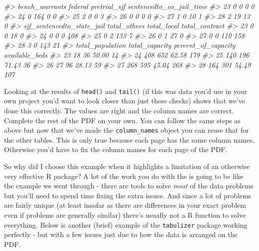\documentclass[
  12pt,
]{book}
\newenvironment{Shaded}{\begin{snugshade}}{\end{snugshade}}
\newcommand{\CommentTok}[1]{\textcolor[rgb]{0.37,0.37,0.37}{\textit{#1}}}
\begin{document}
\begin{Shaded}
\begin{Highlighting}[]
\CommentTok{\#>    bench\_warrants federal pretrial\_sjf sentencedto\_co\_jail\_time}
\CommentTok{\#> 23              0       0            0                        0}
\CommentTok{\#> 24              0     164            0                        0}
\CommentTok{\#> 25              2       0            0                        3}
\CommentTok{\#> 26              0       0            0                        0}
\CommentTok{\#> 27              1       0           10                        1}
\CommentTok{\#> 28              2      19           13                        0}
\CommentTok{\#>    sjf\_sentencedto\_state\_jail total\_others total\_local total\_contract}
\CommentTok{\#> 23                          0            0          18              0}
\CommentTok{\#> 24                          0            0           0            408}
\CommentTok{\#> 25                          0            2         133              7}
\CommentTok{\#> 26                          0            1          27              0}
\CommentTok{\#> 27                          0            0         110            158}
\CommentTok{\#> 28                          3            0         143             21}
\CommentTok{\#>    total\_population total\_capacity percent\_of\_capacity available\_beds}
\CommentTok{\#> 23               18             36               50.00             14}
\CommentTok{\#> 24              408            652               62.58            179}
\CommentTok{\#> 25              140            196               71.43             36}
\CommentTok{\#> 26               27             96               28.13             59}
\CommentTok{\#> 27              268            595               45.04            268}
\CommentTok{\#> 28              164            301               54.49            107}
\end{Highlighting}
\end{Shaded}

Looking at the results of \texttt{head()} and \texttt{tail()} (if this was data you'd use in your own project you'd want to look closer than just these checks) shows that we've done this correctly. The values are right and the column names are correct. Complete the rest of the PDF on your own. You can follow the same steps as above but now that we've made the \texttt{column\_names} object you can reuse that for the other tables. This is only true because each page has the same column names. Otherwise you'd have to fix the column names for each page of the PDF.

So why did I choose this example when it highlights a limitation of an otherwise very effective R package? A lot of the work you do with the is going to be like the example we went through - there are tools to solve \emph{most} of the data problems but you'll need to spend time fixing the extra issues. And since a lot of problems are fairly unique (at least insofar as there are differences in your exact problem even if problems are generally similar) there's usually not a R function to solve everything. Below is another (brief) example of the \texttt{tabulizer} package working perfectly - but with a few issues just due to how the data is arranged on the PDF.
\end{document}

